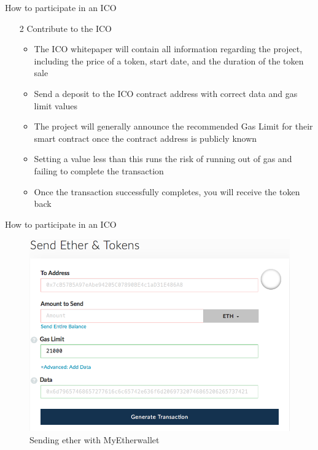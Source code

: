 \documentclass[9pt]{beamer}
\begin{document}

\begin{frame}{How to participate in an ICO}
	\begin{enumerate}
		\item[2] Contribute to the ICO
		\begin{itemize}
			\item The ICO whitepaper will contain all information regarding the project, including the price of a token, start date, and the duration of the token sale
			\item Send a deposit to the ICO contract address with correct data and gas limit values
			\item The project will generally announce the recommended Gas Limit for their smart contract once the contract address is publicly known
			\item Setting a value less than this runs the risk of running out of gas and failing to complete the transaction
			\item Once the transaction successfully completes, you will receive the token back
		\end{itemize}
	\end{enumerate}
\end{frame}



\begin{frame}{How to participate in an ICO}
	\begin{figure}[]
		\centering
		\includegraphics  [scale=0.3]{Images/wallet}
		\caption{Sending ether with MyEtherwallet}
	\end{figure}
\end{frame}
\end{document}
